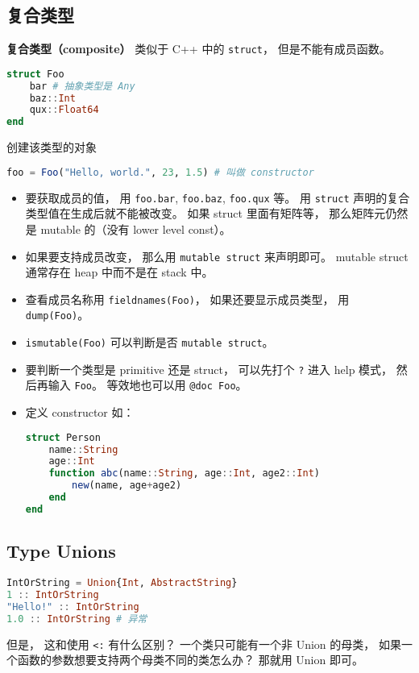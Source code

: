 \subsection{复合类型}
\textbf{复合类型（composite）} 类似于 C++ 中的 \verb|struct|， 但是不能有成员函数。
\begin{lstlisting}[language=julia]
struct Foo
    bar # 抽象类型是 Any
    baz::Int
    qux::Float64
end
\end{lstlisting}
创建该类型的对象
\begin{lstlisting}[language=julia]
foo = Foo("Hello, world.", 23, 1.5) # 叫做 constructor
\end{lstlisting}
\begin{itemize}
\item 要获取成员的值， 用 \verb|foo.bar|, \verb|foo.baz|, \verb|foo.qux| 等。 用 \verb|struct| 声明的复合类型值在生成后就不能被改变。 如果 struct 里面有矩阵等， 那么矩阵元仍然是 mutable 的（没有 lower level const）。
\item 如果要支持成员改变， 那么用 \verb|mutable struct| 来声明即可。 mutable struct 通常存在 heap 中而不是在 stack 中。
\item 查看成员名称用 \verb|fieldnames(Foo)|， 如果还要显示成员类型， 用 \verb|dump(Foo)|。
\item \verb|ismutable(Foo)| 可以判断是否 \verb|mutable struct|。
\item 要判断一个类型是 primitive 还是 struct， 可以先打个 \verb|?| 进入 help 模式， 然后再输入 \verb|Foo|。 等效地也可以用 \verb|@doc Foo|。
\item 定义 constructor 如：
\begin{lstlisting}[language=julia]
struct Person
    name::String
    age::Int
    function abc(name::String, age::Int, age2::Int)
        new(name, age+age2)
    end
end
\end{lstlisting}
\end{itemize}

\subsection{Type Unions}
\begin{lstlisting}[language=julia]
IntOrString = Union{Int, AbstractString}
1 :: IntOrString
"Hello!" :: IntOrString
1.0 :: IntOrString # 异常
\end{lstlisting}
但是， 这和使用 \verb|<:| 有什么区别？ 一个类只可能有一个非 Union 的母类， 如果一个函数的参数想要支持两个母类不同的类怎么办？ 那就用 Union 即可。

